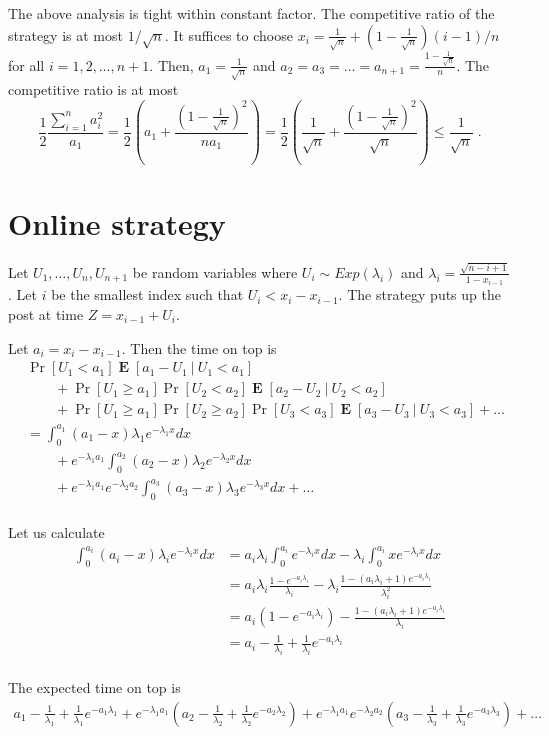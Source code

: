 \documentclass[12pt]{article}
\DeclareMathOperator{\Exp}{\mathbf{E}}
\begin{document}
The above analysis is tight within constant factor. The competitive ratio of the strategy is at most $1/\sqrt{n}$.
It suffices to choose $x_i = \frac{1}{\sqrt{n}} + (1 - \frac{1}{\sqrt{n}}) (i - 1) / n$ for all $i=1,2,\dots,n+1$.
Then, $a_1 = \frac{1}{\sqrt{n}}$ and $a_2 = a_3 = \dots = a_{n+1} = \frac{1 - \frac{1}{\sqrt{n}}}{n}$.
The competitive ratio is at most
$$
\frac{1}{2} \frac{\sum_{i=1}^n a_i^2}{a_1} = \frac{1}{2} \left( a_1 + \frac{(1 - \frac{1}{\sqrt{n}})^2}{n a_1} \right) =
\frac{1}{2} \left( \frac{1}{\sqrt{n}} + \frac{(1 - \frac{1}{\sqrt{n}})^2}{\sqrt{n}} \right) \le \frac{1}{\sqrt{n}} \; .
$$


\section{Online strategy}

Let $U_1, \dots, U_n, U_{n+1}$ be random variables
where $U_i \sim Exp(\lambda_i)$ and $\lambda_i = \frac{\sqrt{n-i+1}}{1 - x_{i-1}}$.
Let $i$ be the smallest index such that $U_i < x_i - x_{i-1}$.
The strategy puts up the post at time $Z = x_{i-1} + U_i$.

Let $a_i = x_i - x_{i-1}$. Then the time on top is
\begin{align*}
& \Pr[U_1 < a_1] \Exp[a_1 - U_1 ~|~ U_1 < a_1]  \\
& \qquad + \Pr[U_1 \ge a_1] \Pr[U_2 < a_2] \Exp[a_2 - U_2 ~|~ U_2 < a_2 ] \\
& \qquad + \Pr[U_1 \ge a_1] \Pr[U_2 \ge a_2] \Pr[U_3 < a_3] \Exp[a_3 - U_3 ~|~ U_3 < a_3] + \dots \\
& = \int_0^{a_1} (a_1 - x) \lambda_1 e^{-\lambda_1 x} dx \\
& \qquad + e^{-\lambda_1 a_1} \int_{0}^{a_2} (a_2 - x) \lambda_2 e^{-\lambda_2 x} dx \\
& \qquad + e^{-\lambda_1 a_1} e^{-\lambda_2 a_2} \int_{0}^{a_3} (a_3 - x) \lambda_3 e^{-\lambda_3 x} dx + \dots \\
\end{align*}

Let us calculate
\begin{align*}
\int_0^{a_i} (a_i - x) \lambda_i e^{-\lambda_i x} dx
& = a_i \lambda_i \int_0^{a_i} e^{-\lambda_i x} dx - \lambda_i  \int_0^{a_i} x e^{-\lambda_i x} dx \\
& = a_i \lambda_i \frac{1 - e^{-a_i \lambda_i}}{\lambda_i} - \lambda_i \frac{1 - (a_i \lambda_i + 1) e^{-a_i \lambda_i}}{\lambda_i^2} \\
& = a_i (1 - e^{-a_i \lambda_i}) - \frac{1 - (a_i \lambda_i + 1) e^{-a_i \lambda_i}}{\lambda_i} \\
& = a_i - \frac{1}{\lambda_i} + \frac{1}{\lambda_i} e^{-a_i \lambda_i} \\
\end{align*}

The expected time on top is
\begin{align*}
a_1 - \frac{1}{\lambda_1} + \frac{1}{\lambda_1} e^{-a_1 \lambda_1}
+ e^{-\lambda_1 a_1} \left(  a_2 - \frac{1}{\lambda_2} + \frac{1}{\lambda_2} e^{-a_2 \lambda_2} \right)
+ e^{-\lambda_1 a_1} e^{-\lambda_2 a_2} \left(  a_3 - \frac{1}{\lambda_3} + \frac{1}{\lambda_3} e^{-a_3 \lambda_3} \right)
+ \dots
\end{align*}
\end{document}
